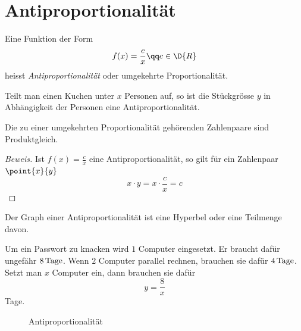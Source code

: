 \documentclass[%
11pt,%
twoside,%
titlepage,%
german,%
headsepline%
]{scrartcl}
\begin{document}
\section{Antiproportionalit\"at}
\begin{cdef}{}
Eine Funktion der Form
$$f(x)=\frac{c}{x}\qq c\in\D{R}$$
heisst \emph{Antiproportionalit\"at} oder umgekehrte Proportionalit\"at.
\end{cdef}
\begin{bsp}
Teilt man einen Kuchen unter $x$ Personen auf, so ist die St\"uckgr\"osse $y$ in Abh\"angigkeit der Personen eine Antiproportionalit\"at.
\end{bsp}
\begin{csatz}{}
Die zu einer umgekehrten Proportionalit\"at geh\"orenden Zahlenpaare sind Produktgleich.
\end{csatz}
\begin{proof}[Beweis]
Ist $f(x)=\frac{c}{x}$ eine Antiproportionalit\"at, so gilt f\"ur ein Zahlenpaar $\point{x}{y}$
$$x\cdot y=x\cdot\frac{c}{x}=c$$
\end{proof}
\begin{csatz}[Hyperbel]{}
Der Graph einer Antiproportionalit\"at ist eine Hyperbel oder eine Teilmenge davon.
\end{csatz}
\begin{bsp}
Um ein Passwort zu knacken wird $1$ Computer eingesetzt. Er braucht daf\"ur ungef\"ahr $\unit[8]{Tage}$. Wenn $2$ Computer parallel rechnen, brauchen sie daf\"ur $\unit[4]{Tage}$. Setzt man $x$ Computer ein, dann brauchen sie daf\"ur
$$y=\frac{8}{x}$$
Tage.

\begin{figure}
\centering
{}
\caption{Antiproportionalit\"at}
\end{figure}
\end{bsp}
\end{document}
